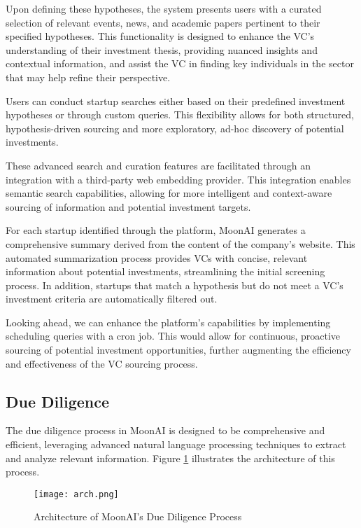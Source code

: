 \documentclass[a4paper, oneside]{discothesis}
\begin{document}
Upon defining these hypotheses, the system presents users with a curated selection of relevant events, news, and academic papers pertinent to their specified hypotheses. This functionality is designed to enhance the VC's understanding of their investment thesis, providing nuanced insights and contextual information, and assist the VC in finding key individuals in the sector that may help refine their perspective.

Users can conduct startup searches either based on their predefined investment hypotheses or through custom queries. This flexibility allows for both structured, hypothesis-driven sourcing and more exploratory, ad-hoc discovery of potential investments.

These advanced search and curation features are facilitated through an integration with a third-party web embedding provider. This integration enables semantic search capabilities, allowing for more intelligent and context-aware sourcing of information and potential investment targets.

For each startup identified through the platform, MoonAI generates a comprehensive summary derived from the content of the company's website. This automated summarization process provides VCs with concise, relevant information about potential investments, streamlining the initial screening process. In addition, startups that match a hypothesis but do not meet a VC's investment criteria are automatically filtered out. 

Looking ahead, we can enhance the platform's capabilities by implementing scheduling queries with a cron job. This would allow for continuous, proactive sourcing of potential investment opportunities, further augmenting the efficiency and effectiveness of the VC sourcing process.

\subsection{Due Diligence}

The due diligence process in MoonAI is designed to be comprehensive and efficient, leveraging advanced natural language processing techniques to extract and analyze relevant information. Figure \ref{fig:due_diligence_arch} illustrates the architecture of this process.

\begin{figure}[h]
    \centering
    \texttt{[image: arch.png]}
    \caption{Architecture of MoonAI's Due Diligence Process}
    \label{fig:due_diligence_arch}
\end{figure}
\end{document}

